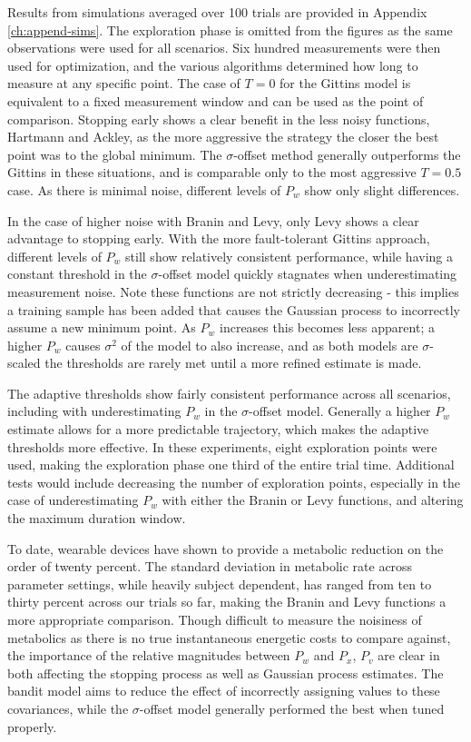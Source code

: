 Results from simulations averaged over 100 trials are provided in Appendix \ref{ch:append-sims}. The exploration phase is omitted from the figures as the same observations were used for all scenarios. Six hundred measurements were then used for optimization, and the various algorithms determined how long to measure at any specific point. The case of $T=0$ for the Gittins model is equivalent to a fixed measurement window and can be used as the point of comparison. Stopping early shows a clear benefit in the less noisy functions, Hartmann and Ackley, as the more aggressive the strategy the closer the best point was to the global minimum. The $\sigma$-offset method generally outperforms the Gittins in these situations, and is comparable only to the most aggressive $T=0.5$ case. As there is minimal noise, different levels of $P_w$ show only slight differences. 

In the case of higher noise with Branin and Levy, only Levy shows a clear advantage to stopping early. With the more fault-tolerant Gittins approach, different levels of $P_w$ still show relatively consistent performance, while having a constant threshold in the $\sigma$-offset model quickly stagnates when underestimating measurement noise. Note these functions are not strictly decreasing - this implies a training sample has been added that causes the Gaussian process to incorrectly assume a new minimum point. As $P_w$ increases this becomes less apparent; a higher $P_w$ causes $\sigma^2$ of the model to also increase, and as both models are $\sigma$-scaled the thresholds are rarely met until a more refined estimate is made. 

The adaptive thresholds show fairly consistent performance across all scenarios, including with underestimating $P_w$ in the $\sigma$-offset model. Generally a higher $P_w$ estimate allows for a more predictable trajectory, which makes the adaptive thresholds more effective. In these experiments, eight exploration points were used, making the exploration phase one third of the entire trial time. Additional tests would include decreasing the number of exploration points, especially in the case of underestimating $P_w$ with either the Branin or Levy functions, and altering the maximum duration window.

To date, wearable devices have shown to provide a metabolic reduction on the order of twenty percent. The standard deviation in metabolic rate across parameter settings, while heavily subject dependent, has ranged from ten to thirty percent across our trials so far, making the Branin and Levy functions a more appropriate comparison. Though difficult to measure the noisiness of metabolics as there is no true instantaneous energetic costs to compare against, the importance of the relative magnitudes between $P_w$ and $P_x$, $P_v$ are clear in both affecting the stopping process as well as Gaussian process estimates. The bandit model aims to reduce the effect of incorrectly assigning values to these covariances, while the $\sigma$-offset model generally performed the best when tuned properly.